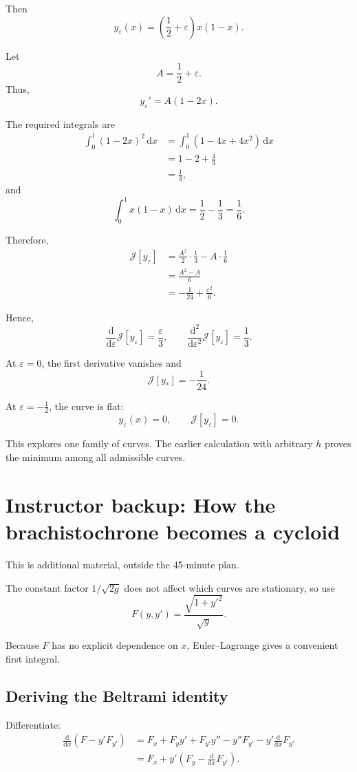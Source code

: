 \documentclass[11pt,a4paper]{article}
\newcommand{\dd}{\mathrm{d}}
\newcommand{\J}{\mathcal{J}}
\begin{document}
Then
\[
y_\varepsilon(x)
=
\left(\frac12+\varepsilon\right)x(1-x).
\]

Let
\[
A=\frac12+\varepsilon.
\]
Thus,
\[
y_\varepsilon'=A(1-2x).
\]

The required integrals are
\begin{align*}
\int_0^1(1-2x)^2\,\dd x
&=
\int_0^1(1-4x+4x^2)\,\dd x\\
&=
1-2+\frac43\\
&=
\frac13,
\end{align*}
and
\[
\int_0^1x(1-x)\,\dd x
=
\frac12-\frac13
=
\frac16.
\]

Therefore,
\begin{align*}
\J[y_\varepsilon]
&=
\frac{A^2}{2}\cdot\frac13-A\cdot\frac16\\
&=
\frac{A^2-A}{6}\\
&=
\boxed{-\frac1{24}+\frac{\varepsilon^2}{6}}.
\end{align*}

Hence,
\[
\boxed{
\frac{\dd}{\dd\varepsilon}\J[y_\varepsilon]
=
\frac{\varepsilon}{3},
\qquad
\frac{\dd^2}{\dd\varepsilon^2}\J[y_\varepsilon]
=
\frac13.
}
\]

At \(\varepsilon=0\), the first derivative vanishes and
\[
\J[y_*]=-\frac1{24}.
\]

At \(\varepsilon=-\tfrac12\), the curve is flat:
\[
y_\varepsilon(x)=0,
\qquad
\J[y_\varepsilon]=0.
\]

This explores one family of curves.
The earlier calculation with arbitrary \(h\) proves the minimum
among all admissible curves.

\section*{Instructor backup: How the brachistochrone becomes a cycloid}

This is additional material, outside the 45-minute plan.

The constant factor \(1/\sqrt{2g}\) does not affect which curves
are stationary, so use
\[
F(y,y')=\frac{\sqrt{1+y'^2}}{\sqrt y}.
\]

Because \(F\) has no explicit dependence on \(x\),
Euler--Lagrange gives a convenient first integral.

\subsection*{Deriving the Beltrami identity}

Differentiate:
\begin{align*}
\frac{\dd}{\dd x}\left(F-y'F_{y'}\right)
&=
F_x+F_y y'+F_{y'}y''
-y''F_{y'}-y'\frac{\dd}{\dd x}F_{y'}\\
&=
F_x+y'\left(F_y-\frac{\dd}{\dd x}F_{y'}\right).
\end{align*}
\end{document}
